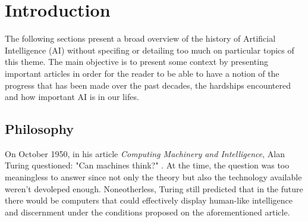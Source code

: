 \documentclass[12pt]{article}
\begin{document}

\section{Introduction}
The following sections present a broad overview of the history of Artificial Intelligence (AI) without specifing or detailing too much on particular topics of this theme. The main objective is to present some context by presenting important articles in order for the reader to be able to have a notion of the progress that has been made over the past decades, the hardships encountered and how important AI is in our lifes. 
\subsection{Philosophy}
On October 1950, in his article \textit{Computing Machinery and Intelligence}, Alan Turing questioned: "Can machines think?" \autocite{turingCOMPUTINGMACHINERYINTELLIGENCE1950}. At the time, the question was too meaningless to answer since not only the theory but also the technology available weren't devoleped enough. Noneotherless, Turing still predicted that in the future there would be computers that could effectively display human-like intelligence and discernment under the conditions proposed on the aforementioned article.

\end{document}
